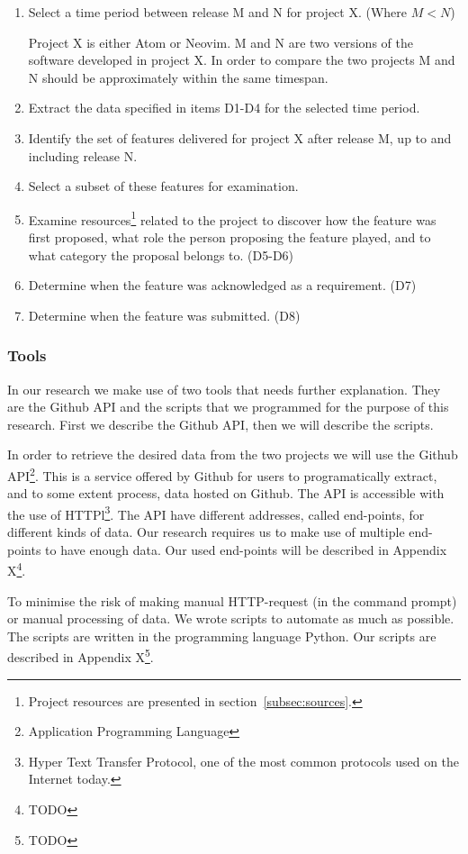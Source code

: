 \documentclass[a4paper,11pt]{article}
\begin{document}
{\begin{enumerate}
	\item Select a time period between release M and N for project X. (Where $ M < N $)

	Project X is either Atom or Neovim. M and N are two versions of the software developed in project X. In order to compare the two projects M and N should be approximately within the same timespan.
	\item Extract the data specified in items D1-D4 for the selected time period.
	\item Identify the set of features delivered for project X after release M, up to and including release N.
	\item Select a subset of these features for examination.
	\item Examine resources\footnote{Project resources are presented in section~\ref{subsec:sources}.} related to the project to discover how the feature was first proposed, what role the person proposing the feature played, and to what category the proposal belongs to. (D5-D6)
	\item Determine when the feature was acknowledged as a requirement. (D7)
	\item Determine when the feature was submitted. (D8)
\end{enumerate}

\subsubsection{Tools}
In our research we make use of two tools that needs further explanation. They are the Github API and the scripts that we programmed for the purpose of this research. First we describe the Github API, then we will describe the scripts.

In order to retrieve the desired data from the two projects we will use the Github API\footnote{Application Programming Language}. This is a service offered by Github for users to programatically extract, and to some extent process, data hosted on Github. The API is accessible with the use of HTTPl\footnote{Hyper Text Transfer Protocol, one of the most common protocols used on the Internet today.}. The API have different addresses, called end-points, for different kinds of data. Our research requires us to make use of multiple end-points to have enough data. Our used end-points will be described in Appendix X\footnote{TODO}.

To minimise the risk of making manual HTTP-request (in the command prompt) or manual processing of data. We wrote scripts to automate as much as possible. The scripts are written in the programming language Python. Our scripts are described in Appendix X\footnote{TODO}.

}
\end{document}
